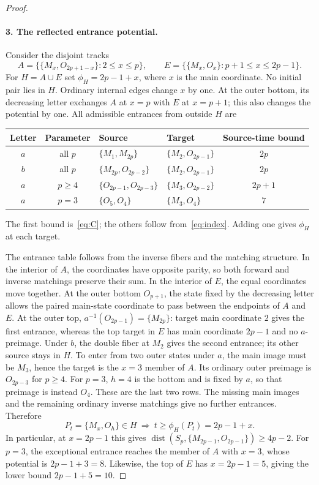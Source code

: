 \documentclass[11pt]{article}
\newcommand{\dist}{\operatorname{dist}}
\newcommand{\M}[1]{M_{#1}}
\newcommand{\Ost}[1]{O_{#1}}
\newcommand{\pair}[2]{\{#1,#2\}}
\begin{document}
\begin{proof}
\paragraph{3. The reflected entrance potential.}
Consider the disjoint tracks
\[
 A=\{\pair{\M x}{\Ost{2p+1-x}}:2\leq x\leq p\},\qquad
 E=\{\pair{\M x}{\Ost x}:p+1\leq x\leq2p-1\}.
\]
For $H=A\cup E$ set $\phi_H=2p-1+x$, where $x$ is the main coordinate. No initial pair lies in $H$. Ordinary internal edges change $x$ by one. At the outer bottom, its decreasing letter exchanges $A$ at $x=p$ with $E$ at $x=p+1$; this also changes the potential by one. All admissible entrances from outside $H$ are
\par\medskip
\begin{center}\small
\renewcommand{\arraystretch}{1.15}%
\begin{tabular}{@{}ccllc@{}}\toprule
Letter & Parameter & Source & Target & Source-time bound\\\midrule
$a$ & all $p$ & $\pair{\M1}{\M{2p}}$ & $\pair{\M2}{\Ost{2p-1}}$ & $2p$\\
$b$ & all $p$ & $\pair{\M{2p}}{\Ost{2p-2}}$ & $\pair{\M2}{\Ost{2p-1}}$ & $2p$\\
$a$ & $p\geq4$ & $\pair{\Ost{2p-1}}{\Ost{2p-3}}$ & $\pair{\M3}{\Ost{2p-2}}$ & $2p+1$\\
$a$ & $p=3$ & $\pair{\Ost5}{\Ost4}$ & $\pair{\M3}{\Ost4}$ & $7$\\\bottomrule
\end{tabular}
\end{center}
\medskip
The first bound is~\eqref{eq:C}; the others follow from~\eqref{eq:index}. Adding one gives $\phi_H$ at each target.

The entrance table follows from the inverse fibers and the matching structure. In the interior of $A$, the coordinates have opposite parity, so both forward and inverse matchings preserve their sum. In the interior of $E$, the equal coordinates move together. At the outer bottom $\Ost{p+1}$, the state fixed by the decreasing letter allows the paired main-state coordinate to pass between the endpoints of $A$ and $E$. At the outer top, $a^{-1}(\Ost{2p-1})=\{\M{2p}\}$: target main coordinate $2$ gives the first entrance, whereas the top target in $E$ has main coordinate $2p-1$ and no $a$-preimage. Under $b$, the double fiber at $\M2$ gives the second entrance; its other source stays in $H$. To enter from two outer states under $a$, the main image must be $\M3$, hence the target is the $x=3$ member of $A$. Its ordinary outer preimage is $\Ost{2p-3}$ for $p\geq4$. For $p=3$, $h=4$ is the bottom and is fixed by $a$, so that preimage is instead $\Ost4$. These are the last two rows. The missing main images and the remaining ordinary inverse matchings give no further entrances. Therefore
\begin{equation}\label{eq:H}
 P_t=\pair{\M x}{\Ost h}\in H\ \Longrightarrow\ t\geq\phi_H(P_t)=2p-1+x.
\end{equation}
In particular, at $x=2p-1$ this gives
$\dist(S_p,\pair{\M{2p-1}}{\Ost{2p-1}})\geq4p-2$.
For $p=3$, the exceptional entrance reaches the member of $A$ with $x=3$, whose potential is $2p-1+3=8$. Likewise, the top of $E$ has $x=2p-1=5$, giving the lower bound $2p-1+5=10$.


\end{proof}
\end{document}
